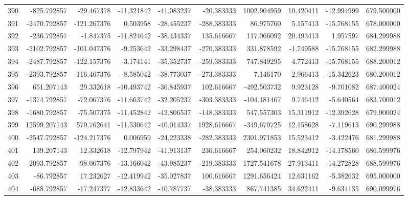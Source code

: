 \begin{tabular}{lrrrrrrrrr}
390 &   -825.792857 &   -29.467378 & -11.321842 & -41.083237 &   -20.383333 &  1002.904959 &  10.420411 & -12.994999 &  679.500000 \\
391 &  -2470.792857 &  -121.267376 &   0.503958 & -28.455237 &  -288.383333 &    86.975760 &   5.157413 & -15.768155 &  678.000000 \\
392 &   -236.792857 &    -1.847375 & -11.824642 & -38.434337 &   135.616667 &   117.066092 &  20.493413 &   1.957597 &  684.299988 \\
393 &  -2102.792857 &  -101.047376 &  -9.253642 & -33.298437 &  -270.383333 &   331.878592 &  -1.749588 & -15.768155 &  682.299988 \\
394 &  -2487.792857 &  -122.157376 &  -3.174141 & -35.352737 &  -259.383333 &   747.849295 &   4.772413 & -15.768155 &  688.200012 \\
395 &  -2393.792857 &  -116.467376 &  -8.585042 & -38.773037 &  -273.383333 &     7.146170 &   2.966413 & -15.342623 &  680.200012 \\
396 &    651.207143 &    29.332618 & -10.493742 & -36.845937 &   102.616667 &  -492.503732 &   9.923128 &  -9.701082 &  687.400024 \\
397 &  -1374.792857 &   -72.067376 & -11.663742 & -32.205237 &  -303.383333 &  -104.181467 &   9.746412 &  -5.640564 &  683.700012 \\
398 &  -1680.792857 &   -75.507375 & -11.452842 & -42.806537 &  -148.383333 &   547.557303 &  15.311912 & -12.392628 &  679.900024 \\
399 &  12599.207143 &   579.762641 & -11.530642 & -40.014337 &  1928.616667 &  -349.670725 &  12.158628 &  -7.119613 &  690.299988 \\
400 &  -2547.792857 &  -124.217376 &   0.006959 & -24.223338 &  -282.383333 &  2301.971853 &  15.523412 &  -3.422476 &  681.299988 \\
401 &    139.207143 &    12.332618 & -12.797942 & -41.913137 &   236.616667 &   254.060232 &  18.842912 & -14.178560 &  686.599976 \\
402 &  -2093.792857 &   -98.067376 & -13.166042 & -43.985237 &  -219.383333 &  1727.541678 &  27.913411 & -14.272828 &  688.599976 \\
403 &    -86.792857 &    17.232627 & -12.419942 & -35.027837 &   100.616667 &  1291.656424 &  12.631162 &  -5.382632 &  695.000000 \\
404 &   -688.792857 &   -17.247377 & -12.833642 & -40.787737 &   -38.383333 &   867.741385 &  34.622411 &  -9.634135 &  690.099976 \\

\end{tabular}
